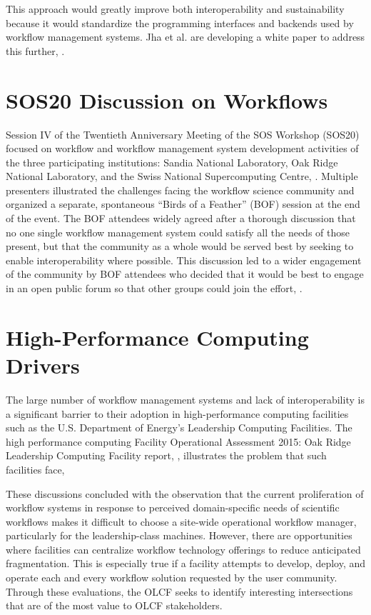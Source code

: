 This approach would greatly improve both interoperability and sustainability
because it would standardize the programming interfaces and backends used by
workflow management systems. Jha et al. are developing a white paper to address
this further, \cite{jha_towards_2016}.

\section{SOS20 Discussion on
Workflows}\label{sos20-discussion-on-workflows}

Session IV of the Twentieth Anniversary Meeting of the SOS Workshop
(SOS20) focused on workflow and workflow management
system development activities of the three participating institutions: Sandia
National Laboratory, Oak Ridge National Laboratory, and the Swiss National Supercomputing Centre, \cite{pack_sos20_2016}. Multiple
presenters illustrated the challenges facing the workflow science community and
organized a separate, spontaneous ``Birds of a Feather'' (BOF) session at
the end of the event. The BOF attendees widely agreed after a thorough
discussion that no one single workflow management system could satisfy
all the needs of those present, but that the community as a whole would
be served best by seeking to enable interoperability where possible. This
discussion led to a wider engagement of the community by BOF attendees
who decided that it would be best to engage in an open public forum so that
other groups could join the effort, \cite{billings_[science-iwg]_2016}.

\section{High-Performance Computing
Drivers}\label{high-performance-computing-drivers}

The large number of workflow management systems and lack of
interoperability is a significant barrier to their adoption in
high-performance computing facilities such as the U.S. Department of Energy's
Leadership Computing Facilities. The high performance computing Facility
Operational Assessment 2015: Oak Ridge Leadership Computing Facility
report, \cite{barker_scientific_2007}, illustrates the problem that such facilities
face,

\begin{displayquote}
These discussions concluded with the observation that the current proliferation
of workflow systems in response to perceived domain-specific needs of 
scientific workflows makes it difficult to choose a site-wide operational
workflow manager, particularly for the leadership-class machines. However,
there are opportunities where facilities can centralize workflow technology 
offerings to reduce anticipated fragmentation. This is especially true if a 
facility attempts to develop, deploy, and operate each and every workflow 
solution requested by the user community. Through these evaluations, the OLCF
seeks to identify interesting intersections that are of the most value to OLCF
stakeholders.
\end{displayquote}

